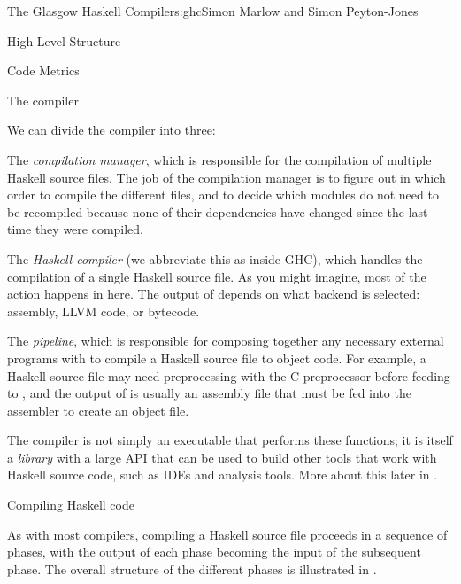 \begin{aosachapter}{The Glasgow Haskell Compiler}{s:ghc}{Simon Marlow and Simon Peyton-Jones}
\begin{aosasect1}{High-Level Structure}
\begin{aosasect2}{Code Metrics}
\end{aosasect2}

\begin{aosasect2}{The compiler}

We can divide the compiler into three:

\begin{aosaitemize}

\item The \emph{compilation manager}, which is responsible for the
  compilation of multiple Haskell source files.  The job of the
  compilation manager is to figure out in which order to compile the
  different files, and to decide which modules do not need to be
  recompiled because none of their dependencies have changed since the
  last time they were compiled.

\item The \emph{Haskell compiler} (we abbreviate this as 
  inside GHC), which handles the compilation of a single Haskell
  source file.  As you might imagine, most of the action happens in
  here.  The output of  depends on what backend is selected:
  assembly, LLVM code, or bytecode.

\item The \emph{pipeline}, which is responsible for composing together
  any necessary external programs with  to compile a Haskell
  source file to object code.  For example, a Haskell source file may
  need preprocessing with the C preprocessor before feeding to
  , and the output of  is usually an assembly file
  that must be fed into the assembler to create an object file.

\end{aosaitemize}

The compiler is not simply an executable that performs these
functions; it is itself a \emph{library} with a large API that can be
used to build other tools that work with Haskell source code, such as
IDEs and analysis tools.  More about this later in
.

\end{aosasect2}

\begin{aosasect2}{Compiling Haskell code}

As with most compilers, compiling a Haskell source file proceeds in a
sequence of phases, with the output of each phase becoming the input
of the subsequent phase.  The overall structure of the different
phases is illustrated in .


\end{aosasect2}
\end{aosasect1}
\end{aosachapter}
